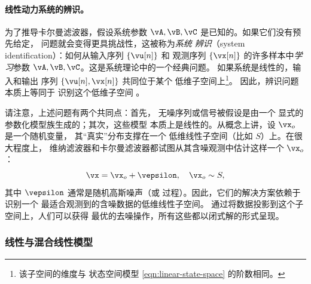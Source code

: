 \documentclass[../../book-main_zh.tex]{subfiles}
\begin{document}
\paragraph{线性动力系统的辨识。}
为了推导卡尔曼滤波器，假设系统参数 \(\vA, \vB, \vC\)
是已知的。如果它们没有预先给定，
问题就会变得更具挑战性，这被称为\textit{系统
辨识}（system identification）：如何从输入序列 \(\{\vu[n]\}\) 和
观测序列 \(\{\vx[n]\}\) 的许多样本中\textit{学习}参数 \(\vA, \vB,
\vC\)。这是系统理论中的一个经典问题。
如果系统是线性的，输入和输出
序列 \(\{\vu[n], \vx[n]\}\) 共同位于某个
低维子空间上\footnote{该子空间的维度与
状态空间模型 \eqref{eqn:linear-state-space} 的阶数相同。}。
因此，辨识问题本质上等同于
识别这个低维子空间
\cite{OverscheeP1996,Liu-2009-CDC,Liu-2010-SIAM}。

请注意，上述问题有两个共同点：首先，
无噪序列或信号被假设是由一个
显式的参数化模型族生成的；其次，这些模型
本质上是线性的。从概念上讲，设 \(\vx_{o}\) 是一个随机变量，
其“真实”分布支撑在一个
低维线性子空间（比如 \(S\)）上。在很大程度上，
维纳滤波器和卡尔曼滤波器都试图从其含噪观测中估计这样一个
\(\vx_{o}\)：
\begin{equation}
    \vx = \vx_{o} + \vepsilon, \quad \vx_{o} \sim S,
\end{equation}
其中 \(\vepsilon\) 通常是随机高斯噪声（或
过程）。因此，它们的解决方案依赖于识别一个
最适合观测到的含噪数据的低维线性子空间。
通过将数据投影到这个子空间上，人们可以获得
最优的去噪操作，所有这些都以闭式解的形式呈现。

\subsubsection{线性与混合线性模型}
\label{sec:PCA-ICA}
\end{document}
